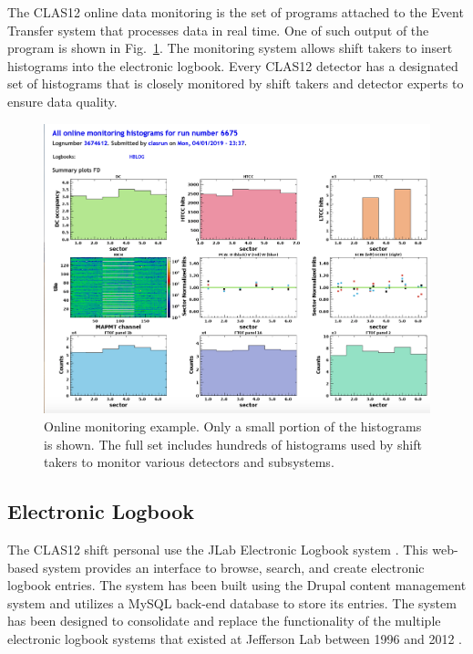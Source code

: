 The CLAS12 online data monitoring is the set of programs attached to the Event Transfer system that processes data in real time. One of such output of the program is shown in Fig.~\ref{fig:online_monitor}. The monitoring system allows shift takers to insert histograms into the electronic logbook. Every CLAS12 detector has a designated set of histograms that is closely monitored by shift takers and detector experts to ensure data quality.

\begin{figure}[hbt]
	\centering
	\includegraphics[width=1.0\columnwidth,keepaspectratio]{img/online_monitor.png}
	\caption{Online monitoring example. Only a small portion of the histograms is shown. The full set includes hundreds of histograms used by shift takers to monitor various detectors and subsystems.}
	\label{fig:online_monitor}
\end{figure}

\subsection{Electronic Logbook}

The CLAS12 shift personal use the JLab Electronic Logbook system \cite{logbook-ref}. This web-based system provides an interface to browse, search, and create electronic logbook entries. The system has been built using the Drupal content management system and utilizes a MySQL back-end database to store its entries. The system has been designed to consolidate and replace the functionality of the multiple electronic logbook systems that existed at Jefferson Lab between 1996 and 2012 .

